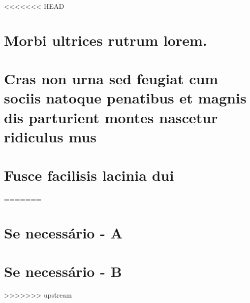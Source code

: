 \begin{anexosenv}


<<<<<<< HEAD
\chapter{Morbi ultrices rutrum lorem.}
\lipsum[30]

\chapter{Cras non urna sed feugiat cum sociis natoque penatibus et magnis dis
parturient montes nascetur ridiculus mus}

\lipsum[31]

\chapter{Fusce facilisis lacinia dui}

\lipsum[32]
=======
\chapter{Se necessário - A}


\chapter{Se necessário - B}


>>>>>>> upstream

\end{anexosenv}
